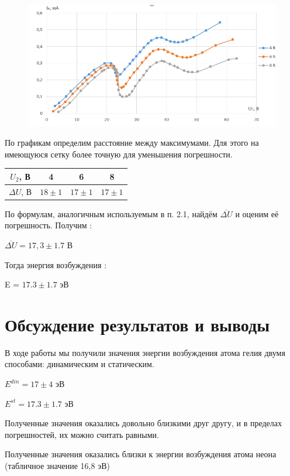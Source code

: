 \documentclass[12pt,a4paper]{article}
\begin{document}
\begin{figure}[H]
	\begin{center}
		\includegraphics[width=14cm]{5.2.1-7}
	\end{center}
\end{figure}

По графикам определим расстояние между максимумами. Для этого на имеющуюся сетку более точную для уменьшения погрешности.

\begin{center}
\begin{large}
\begin{tabular}{|c|c|c|c|}
\hline 
$U_2$, В & 4 & 6 & 8 \\ 
\hline 
$\Delta U$, В & $18 \pm 1$ & $17 \pm 1$ & $17 \pm 1$ \\ 
\hline 
\end{tabular} 
\end{large}
\end{center}

По формулам, аналогичным используемым в п. 2.1, найдём $\overline{\Delta U}$ и оценим её погрешность. Получим :

\begin{large}
$\overline{\Delta U} = 17,3 \pm 1.7$ В
\end{large}

Тогда энергия возбуждения : \begin{large} E = $17.3 \pm 1.7$ эВ \end{large}

\section{Обсуждение результатов и выводы}

В ходе работы мы получили значения энергии возбуждения атома гелия двумя способами: динамическим и статическим.

\begin{large}
$E^{din} = 17 \pm 4$ эВ

$E^{st} = 17.3 \pm 1.7$ эВ
\end{large} 
 
Полученные значения оказались довольно близкими друг другу, и в пределах погрешностей, их можно считать равными.

Полученные значения оказались близки к энергии возбуждения атома неона (табличное значение 16,8 эВ)
\end{document}
